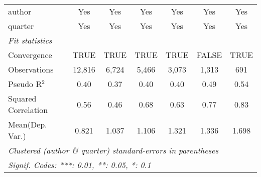 \begin{tabular}{lcccccc}
   author                                                     & Yes           & Yes           & Yes           & Yes           & Yes          & Yes\\  
   quarter                                                    & Yes           & Yes           & Yes           & Yes           & Yes          & Yes\\  
   \midrule
   \emph{Fit statistics}\\
   Convergence                                                &TRUE           & TRUE          & TRUE          & TRUE          & FALSE        & TRUE\\  
   Observations                                               & 12,816        & 6,724         & 5,466         & 3,073         & 1,313        & 691\\  
   Pseudo R$^2$                                               & 0.40          & 0.37          & 0.40          & 0.40          & 0.49         & 0.54\\  
   Squared Correlation                                        & 0.56          & 0.46          & 0.68          & 0.63          & 0.77         & 0.83\\  
Mean(Dep. Var.) & 0.821 & 1.037 & 1.106 & 1.321 & 1.336 & 1.698 \\
   \midrule \midrule
   \multicolumn{7}{l}{\emph{Clustered (author \& quarter) standard-errors in parentheses}}\\
   \multicolumn{7}{l}{\emph{Signif. Codes: ***: 0.01, **: 0.05, *: 0.1}}\\
\end{tabular}
\par\endgroup
